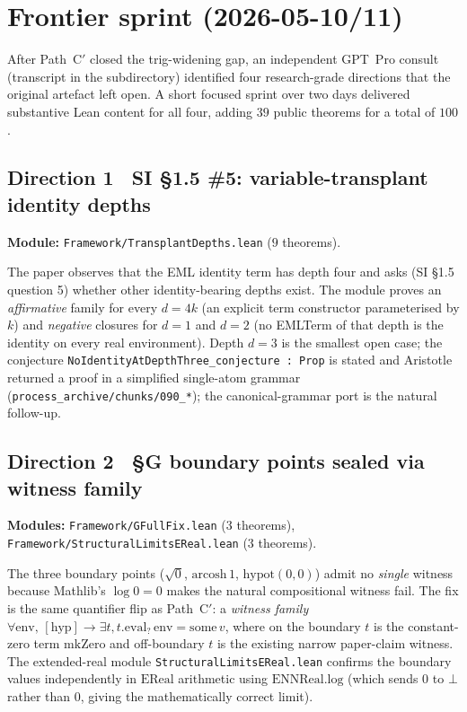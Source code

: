 \documentclass[11pt]{article}
\theoremstyle{plain}
\theoremstyle{definition}
\begin{document}
\section{Frontier sprint (2026-05-10/11)}
\label{sec:frontier-sprint}

After Path~C$'$ closed the trig-widening gap, an independent GPT~Pro
consult (transcript in the
 subdirectory)
identified four research-grade directions that the original artefact
left open. A short focused sprint over two days delivered substantive
Lean content for all four, adding $39$ public theorems for a total
of $100$.

\subsection*{Direction 1 \textemdash\ SI \S1.5 \#5: variable-transplant
identity depths}

\noindent\textbf{Module:} \texttt{Framework/TransplantDepths.lean}
($9$ theorems).

The paper observes that the EML identity term has depth four and
asks (SI \S1.5 question 5) whether other identity-bearing depths
exist. The module proves an \emph{affirmative} family for every
$d = 4k$ (an explicit term constructor parameterised by $k$) and
\emph{negative} closures for $d = 1$ and $d = 2$ (no EMLTerm of
that depth is the identity on every real environment). Depth $d = 3$
is the smallest open case; the conjecture
\texttt{NoIdentityAtDepthThree\_conjecture : Prop} is stated and
Aristotle returned a proof in a simplified single-atom grammar
(\texttt{process\_archive/chunks/090\_*}); the
canonical-grammar port is the natural follow-up.

\subsection*{Direction 2 \textemdash\ \S G boundary points sealed via
witness family}

\noindent\textbf{Modules:} \texttt{Framework/GFullFix.lean} ($3$
theorems), \texttt{Framework/StructuralLimitsEReal.lean} ($3$
theorems).

The three boundary points ($\sqrt{0}$, $\mathrm{arcosh}\,1$,
$\mathrm{hypot}(0,0)$) admit no \emph{single} witness because Mathlib's
$\log 0 = 0$ makes the natural compositional witness fail. The fix
is the same quantifier flip as Path~C$'$: a \emph{witness family}
$\forall \mathrm{env},\,[\mathrm{hyp}] \to \exists t,
t.\mathrm{eval}_?\,\mathrm{env} = \mathrm{some}\,v$, where on the
boundary $t$ is the constant-zero term $\mathrm{mkZero}$ and
off-boundary $t$ is the existing narrow paper-claim witness. The
extended-real module \texttt{StructuralLimitsEReal.lean} confirms
the boundary values independently in $\mathrm{EReal}$ arithmetic
using $\mathrm{ENNReal.log}$ (which sends $0$ to $\bot$ rather than
$0$, giving the mathematically correct limit).
\end{document}
